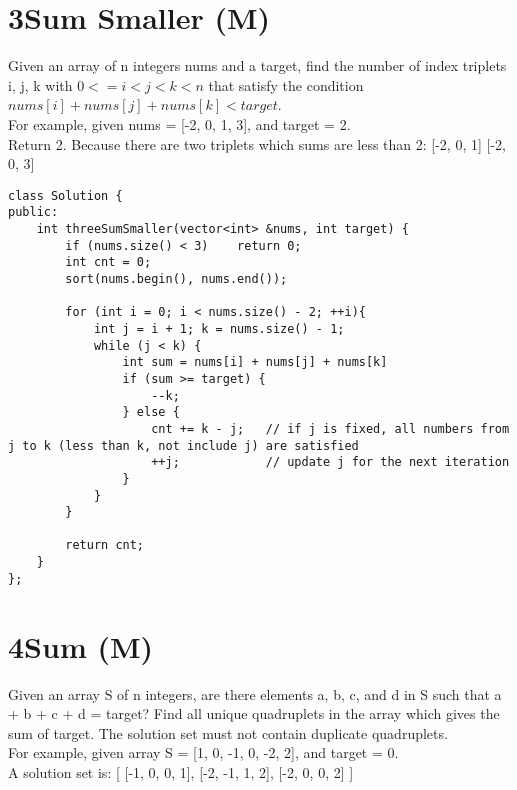 \section{3Sum Smaller (M)}
Given an array of n integers nums and a target, find the number of index triplets i, j, k with $0 <= i < j < k < n$ that satisfy the condition $nums[i] + nums[j] + nums[k] < target$.\\

For example, given nums = [-2, 0, 1, 3], and target = 2.\\

Return 2. Because there are two triplets which sums are less than 2:
[-2, 0, 1]
[-2, 0, 3]\\

\begin{lstlisting}
class Solution {
public:
    int threeSumSmaller(vector<int> &nums, int target) {
        if (nums.size() < 3)    return 0;
        int cnt = 0;
        sort(nums.begin(), nums.end());
        
        for (int i = 0; i < nums.size() - 2; ++i){
            int j = i + 1; k = nums.size() - 1;
            while (j < k) {
                int sum = nums[i] + nums[j] + nums[k]
                if (sum >= target) {
                    --k;
                } else {
                    cnt += k - j;   // if j is fixed, all numbers from j to k (less than k, not include j) are satisfied
                    ++j;            // update j for the next iteration
                }
            }
        }
        
        return cnt;
    }
};
\end{lstlisting}


\section{4Sum (M)}
Given an array S of n integers, are there elements a, b, c, and d in S such that a + b + c + d = target? Find all unique quadruplets in the array which gives the sum of target. The solution set must not contain duplicate quadruplets.\\

For example, given array S = [1, 0, -1, 0, -2, 2], and target = 0.\\
A solution set is:
[
  [-1,  0, 0, 1],
  [-2, -1, 1, 2],
  [-2,  0, 0, 2]
]\\

